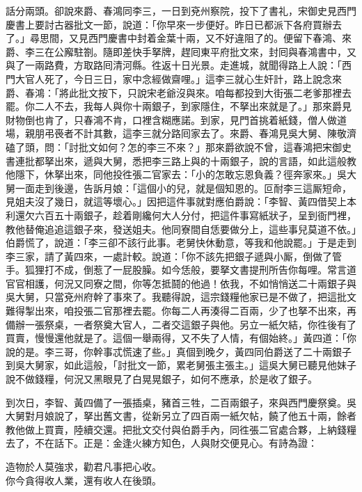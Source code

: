 話分兩頭。卻說來爵、春鴻同李三，一日到兗州察院，投下了書礼，宋御史見西門慶書上要討古器批文一節，說道：「你早來一步便好。昨日已都派下各府買辦去了。」尋思間，又見西門慶書中封着金葉十兩，又不好違阻了的。便留下春鴻、來爵、李三在公廨駐劄。隨即差快手拏牌，趕囘東平府批文來，封囘與春鴻書中，又與了一兩路費，方取路囘清河縣。徃返十日光景。走進城，就聞得路上人說：「西門大官人死了，今日三日，家中念經做齋哩。」這李三就心生奸計，路上說念來爵、春鴻：「將此批文按下，只說宋老爺沒與來。咱每都投到大街張二老爹那裡去罷。{}你二人不去，我每人與你十兩銀子，到家隱住，不拏出來就是了。」那來爵見財物倒也肯了，只春鴻不肯，口裡含糊應諾。{}到家，見門首挑着紙錢，僧人做道場，親朋弔䘮者不計其數，這李三就分路囘家去了。來爵、春鴻見吳大舅、陳敬濟磕了頭，問：「討批文如何？怎的李三不來？」那來爵欲說不曾，這春鴻把宋御史書連批都拏出來，遞與大舅，悉把李三路上與的十兩銀子，說的言語，如此這般教他隱下，休拏出來，同他投徃張二官家去：「小的怎敢忘恩負義？徑奔家來。」吳大舅一面走到後邊，告訴月娘：「這個小的兒，就是個知恩的。叵耐李三這厮短命，見姐夫沒了幾日，就這等壞心。」{}因把這件事就對應伯爵說：「李智、黃四借契上本利還欠六百五十兩銀子，趁着剛纔何大人分付，把這件事寫紙狀子，呈到衙門裡，教他替俺追追這銀子來，發送姐夫。他同寮間自恁要做分上，這些事兒莫道不依。」伯爵慌了，說道：「李三卻不該行此事。老舅快休動意，等我和他說罷。」于是走到李三家，請了黃四來，一處計較。說道：「你不該先把銀子遞與小厮，倒做了管手。狐狸打不成，倒惹了一屁股臊。如今恁般，要拏文書提刑所告你每哩。常言道官官相護，何況又同寮之間，你等怎抵鬪的他過！依我，不如悄悄送二十兩銀子與吳大舅，只當兗州府幹了事來了。我聽得說，這宗錢糧他家已是不做了，把這批文難得掣出來，咱投張二官那裡去罷。你每二人再湊得二百兩，少了也拏不出來，再備辦一張祭桌，一者祭奠大官人，二者交這銀子與他。另立一紙欠結，你徃後有了買賣，慢慢還他就是了。這個一舉兩得，又不失了人情，有個始終。」{}黃四道：「你說的是。李三哥，你幹事忒慌速了些。」真個到晚夕，黃四同伯爵送了二十兩銀子到吳大舅家，如此這般，「討批文一節，累老舅張主張主。」這吳大舅已聽見他妹子說不做錢糧，何況又黑眼見了白晃晃銀子，如何不應承，於是收了銀子。

到次日，李智、黃四備了一張插桌，豬首三牲，二百兩銀子，來與西門慶祭奠。吳大舅對月娘說了，拏出舊文書，從新另立了四百兩一紙欠帖，饒了他五十兩，餘者教他做上買賣，陸續交還。把批文交付與伯爵手內，同徃張二官處合夥，上納錢糧去了，不在話下。正是：金逢火練方知色，人與財交便見心。有詩為證：

\begin{myquote} 
造物於人莫強求，勸君凡事把心收。\\你今貪得收人業，還有收人在後頭。{}
\end{myquote} 

